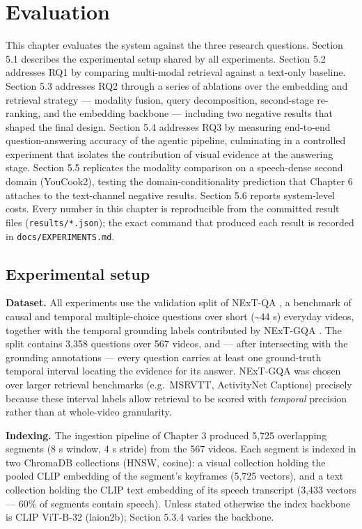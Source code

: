 \chapter{Evaluation}

This chapter evaluates the system against the three research questions.
Section 5.1 describes the experimental setup shared by all experiments.
Section 5.2 addresses RQ1 by comparing multi-modal retrieval against a
text-only baseline. Section 5.3 addresses RQ2 through a series of
ablations over the embedding and retrieval strategy --- modality fusion,
query decomposition, second-stage re-ranking, and the embedding backbone
--- including two negative results that shaped the final design. Section
5.4 addresses RQ3 by measuring end-to-end question-answering accuracy of
the agentic pipeline, culminating in a controlled experiment that
isolates the contribution of visual evidence at the answering stage.
Section 5.5 replicates the modality comparison on a speech-dense second
domain (YouCook2), testing the domain-conditionality prediction that
Chapter 6 attaches to the text-channel negative results. Section 5.6
reports system-level costs. Every number in this chapter is reproducible
from the committed result files (\texttt{results/*.json}); the exact
command that produced each result is recorded in
\texttt{docs/EXPERIMENTS.md}.

\section{Experimental setup}

\textbf{Dataset.} All experiments use the validation split of NExT-QA
\autocite{xiao2021nextqa}, a benchmark of causal and temporal
multiple-choice questions over short (\textasciitilde44 s) everyday
videos, together with the temporal grounding labels contributed by
NExT-GQA \autocite{xiao2024nextgqa}. The split contains 3,358 questions
over 567 videos, and --- after intersecting with the grounding
annotations --- every question carries at least one ground-truth
temporal interval locating the evidence for its answer. NExT-GQA was
chosen over larger retrieval benchmarks (e.g.~MSRVTT, ActivityNet
Captions) precisely because these interval labels allow retrieval to be
scored with \emph{temporal} precision rather than at whole-video
granularity.

\textbf{Indexing.} The ingestion pipeline of Chapter 3 produced 5,725
overlapping segments (8 s window, 4 s stride) from the 567 videos. Each
segment is indexed in two ChromaDB collections (HNSW, cosine): a visual
collection holding the pooled CLIP embedding of the segment's keyframes
(5,725 vectors), and a text collection holding the CLIP text embedding
of its speech transcript (3,433 vectors --- 60\% of segments contain
speech). Unless stated otherwise the index backbone is CLIP ViT-B-32
(laion2b); Section 5.3.4 varies the backbone.

